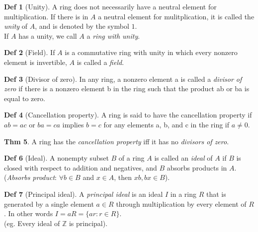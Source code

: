 \documentclass{article}
\theoremstyle{definition}
\newtheorem{definition}{Def}[section]
\newtheorem{theorem}[definition]{Thm}
\begin{document}
\begin{definition}[Unity]
    A ring does not necessarily have a neutral element for multiplication. If there is in $A$ a neutral element for mulitplication, it is called the \emph{unity} of $A$, and is denoted by the symbol $1$.
    \\
    If $A$ has a unity, we call $A$ a \emph{ring with unity}.
\end{definition}

\begin{definition}[Field]
    If $A$ is a commutative ring with unity in which every nonzero element is invertible, $A$ is called a \emph{field}.
\end{definition}

\begin{definition}[Divisor of zero]
    In any ring, a nonzero element a is called a \emph{divisor of zero} if there is a
    nonzero element b in the ring such that the product ab or ba is equal to
    zero.
\end{definition}

\begin{definition}[Cancellation property]
A ring is said to have the cancellation property if $ab = ac$ or $ba = ca$ implies $b = c$
for any elements a, b, and c in the ring if $a \neq 0$.
\end{definition}

\begin{theorem}
    A ring has the \emph{cancellation property} iff it has no \emph{divisors of zero}.
\end{theorem}

\begin{definition}[Ideal]
    A nonempty subset $B$ of a ring $A$ is called an \emph{ideal} of $A$ if $B$ is closed with respect to addition and negatives, and $B$ absorbs products in $A$.
    \\
    (\emph{Absorbs product}: $\forall b \in B$ and $x \in A$, then $xb, bx \in B$).
\end{definition}

\begin{definition}[Principal ideal]
    A \emph{principal ideal} is an ideal $I$ in a ring $R$ that is generated by a single element $a \in R$ through multiplication by every element of $R$. In other words $I = aR = \{a r : r \in R \}$.
    \\
    (eg. Every ideal of $\mathbb{Z}$ is principal).
\end{definition}
\end{document}
